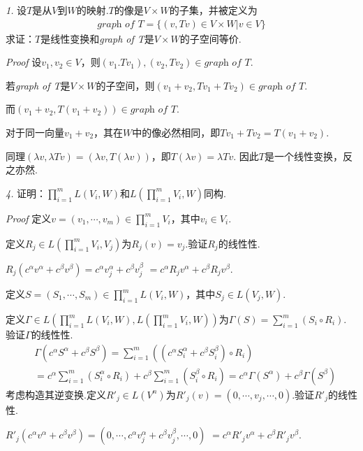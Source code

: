 \textit{1.}
设\(T\)是从\(V\)到\(W\)的映射.\(T\)的像是\(V \times W\)的子集，并被定义为
    \begin{align*}
        \textit{graph of T}= \{(v,Tv) \in V \times W |v \in V\}
    \end{align*}
求证：\(T\)是线性变换和\textit{graph of T}是\(V \times W\)的子空间等价.

\textit{Proof}
设\(v_1,v_2 \in V\)，则\((v_1.Tv_1),(v_2,Tv_2) \in \textit{graph of T}\).

若\textit{graph of T}是\(V \times W\)的子空间，则\((v_1+v_2,Tv_1+Tv_2) \in \textit{graph of T}\).

而\((v_1+v_2,T(v_1+v_2)) \in \textit{graph of T}\).

对于同一向量\(v_1+v_2\)，其在\(W\)中的像必然相同，即\(Tv_1+Tv_2=T(v_1+v_2)\).

同理\((\lambda v,\lambda Tv)=(\lambda v,T(\lambda v))\)，即\(T(\lambda v)=\lambda Tv\).
因此\(T\)是一个线性变换，反之亦然.

\hspace*{\fill}

\textit{4.}
证明：\(\prod_{i=1}^m L(V_i,W)\)和\(L(\prod_{i=1}^m V_i,W)\)同构.

\textit{Proof}
定义\(v=(v_1,\cdots,v_m) \in \prod_{i=1}^m V_i\)，其中\(v_i \in V_i\).

定义\(R_j \in L(\prod_{i=1}^m V_i,V_j)\)为\(R_j(v)=v_j\).验证\(R_j\)的线性性.

\(R_j(c^\alpha v^\alpha+c^\beta v^\beta)=c^\alpha v_j^\alpha+c^\beta v_j^\beta\)
\(=c^\alpha R_j v^\alpha+c^\beta R_j v^\beta\).

定义\(S=(S_1,\cdots,S_m) \in \prod_{i=1}^m L(V_i,W)\)，其中\(S_j \in L(V_j,W)\).

定义\(\Gamma \in L(\prod_{i=1}^m L(V_i,W),L(\prod_{i=1}^m V_i,W))\)为\(\Gamma(S)=\sum_{i=1}^m (S_i \circ R_i)\).
验证\(\Gamma\)的线性性.
    \begin{align*}
        &\Gamma(c^\alpha S^\alpha+c^\beta S^\beta)
        =\sum_{i=1}^m ((c^\alpha S_i^\alpha+c^\beta S_i^\beta) \circ R_i) \\
        &=c^\alpha \sum_{i=1}^m(S_i^\alpha \circ R_i)+c^\beta \sum_{i=1}^m(S_i^\beta \circ R_i)
        =c^\alpha \Gamma(S^\alpha)+c^\beta \Gamma(S^\beta)
    \end{align*}
考虑构造其逆变换.定义\(R'_j \in L(V^n)\)为\(R'_j(v)=(0,\cdots,v_j,\cdots,0)\).验证\(R'_j\)的线性性.

\(R'_j(c^\alpha v^\alpha+c^\beta v^\beta)=(0,\cdots,c^\alpha v_j^\alpha+c^\beta v_j^\beta,\cdots,0)\)
\(=c^\alpha R'_j v^\alpha+c^\beta R'_j v^\beta\).

